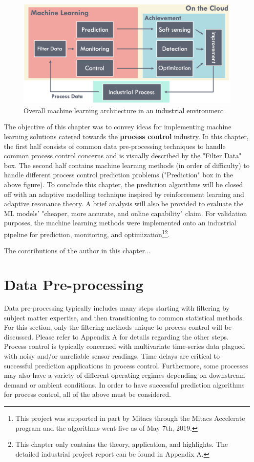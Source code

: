 \begin{figure}[h]
    \centering
    \includegraphics[width=\textwidth]{images/ch2/02AICloud.png}
    \caption{Overall machine learning architecture in an industrial environment}
    \label{fig:02AICloud}
\end{figure}

The objective of this chapter was to convey ideas for implementing machine learning solutions catered towards the \textbf{process control} industry.  In this chapter, the first half consists of common data pre-processing techniques to handle common process control concerns and is visually described by the "Filter Data" box.  The second half contains machine learning methods (in order of difficulty) to handle different process control prediction problems ("Prediction" box in the above figure). To conclude this chapter, the prediction algorithms will be closed off with an adaptive modelling technique inspired by reinforcement learning and adaptive resonance theory. A brief analysis will also be provided to evaluate the ML models' "cheaper, more accurate, and online capability" claim. For validation purposes, the machine learning methods were implemented onto an industrial pipeline for prediction, monitoring, and optimization\footnote{This project was supported in part by Mitacs through the Mitacs Accelerate program and the algorithms went live as of May 7th, 2019.}\footnote{This chapter only contains the theory, application, and highlights. The detailed industrial project report can be found in Appendix A.}.

The contributions of the author in this chapter...

\section{Data Pre-processing}
Data pre-processing typically includes many steps starting with filtering by subject matter expertise, and then transitioning to common statistical methods.  For this section, only the filtering methods unique to process control will be discussed. Please refer to Appendix A for details regarding the other steps. Process control is typically concerned with multivariate time-series data plagued with noisy and/or unreliable sensor readings. Time delays are critical to successful prediction applications in process control. Furthermore, some processes may also have a variety of different operating regimes depending on downstream demand or ambient conditions.  In order to have successful prediction algorithms for process control, all of the above must be considered.

